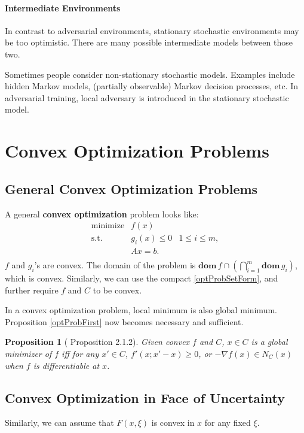 \documentclass[openany]{book}
\newtheorem{proposition}{Proposition}[chapter]
\theoremstyle{definition}
\theoremstyle{remark}
\begin{document}
\paragraph{Intermediate Environments}
In contrast to adversarial environments, stationary stochastic environments may be too optimistic. There are many possible intermediate models between those two.

Sometimes people consider non-stationary stochastic models. Examples include hidden Markov models, (partially observable) Markov decision processes, etc. In adversarial training, local adversary is introduced in the stationary stochastic model.

\section{Convex Optimization Problems}
\subsection{General Convex Optimization Problems}
A general \textbf{convex optimization} problem looks like:
\begin{equation}\label{convOptProb}
\begin{array}{lll}
\mathrm{minimize} & f(x) & \\
\mathrm{s.t.} & g_i(x)\le0 & 1\le i\le m, \\
 & Ax=b. & \\
\end{array}
\end{equation}
$f$ and $g_i$'s are convex. The domain of the problem is $\mathbf{dom}\,f\cap\left(\bigcap_{i=1}^m\mathbf{dom}\,g_i\right)$, which is convex. Similarly, we can use the compact \eqref{optProbSetForm}, and further require $f$ and $C$ to be convex.

In a convex optimization problem, local minimum is also global minimum. Proposition \ref{optProbFirst} now becomes necessary and sufficient.
\begin{proposition}[\cite{BL10} Proposition 2.1.2]\label{convOptProbFirst}
    Given convex $f$ and $C$, $x\in C$ is a global minimizer of $f$ iff for any $x'\in C$, $f'(x;x'-x)\ge0$, or $-\nabla f(x)\in N_C(x)$ when $f$ is differentiable at $x$.
\end{proposition}

\subsection{Convex Optimization in Face of Uncertainty}
Similarly, we can assume that $F(x,\xi)$ is convex in $x$ for any fixed $\xi$.
\end{document}
